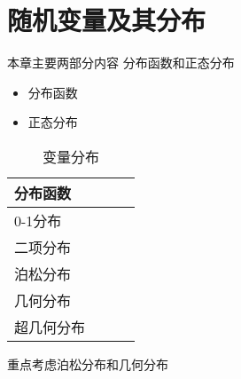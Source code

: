 \chapter{随机变量及其分布}
本章主要两部分内容
分布函数和正态分布

\begin{itemize}
	\item 分布函数
	\item 正态分布
\end{itemize}



\begin{table}
	\centering
	\caption{变量分布}
	\begin{tabular}{|l|l|l|l|}
		\hline
		分布函数 &  &  &  \\ \hline
		0-1分布 &  &  &  \\ \hline
		二项分布 &  &  &  \\ \hline
		泊松分布 &  &  &  \\ \hline
		几何分布 &  &  &  \\ \hline
		超几何分布 &  &  &  \\ \hline
	\end{tabular}
\end{table}

重点考虑泊松分布和几何分布

